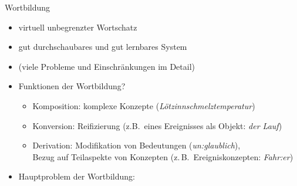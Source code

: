 \begin{frame}
  {Wortbildung}
  \pause
  \begin{itemize}[<+->]
    \item virtuell unbegrenzter Wortschatz
      \Zeile
    \item gut durchschaubares und \alert{gut lernbares} System
    \item (viele Probleme und Einschränkungen im Detail)
      \Zeile
    \item Funktionen der Wortbildung?
      \begin{itemize}
        \item Komposition: \alert{komplexe Konzepte} (\textit{Lötzinnschmelztemperatur})
        \item Konversion: \alert{Reifizierung} (z.B.\ eines Ereignisses als Objekt: \textit{der Lauf})
        \item Derivation: \alert{Modifikation von Bedeutungen} (\textit{un:glaublich}),\\
          \alert{Bezug auf Teilaspekte von Konzepten} (z.\,B.\ Ereigniskonzepten: \textit{Fahr:er})
      \end{itemize}
      \Halbzeile
    \item Hauptproblem der Wortbildung:\\
  \end{itemize}
\end{frame}

